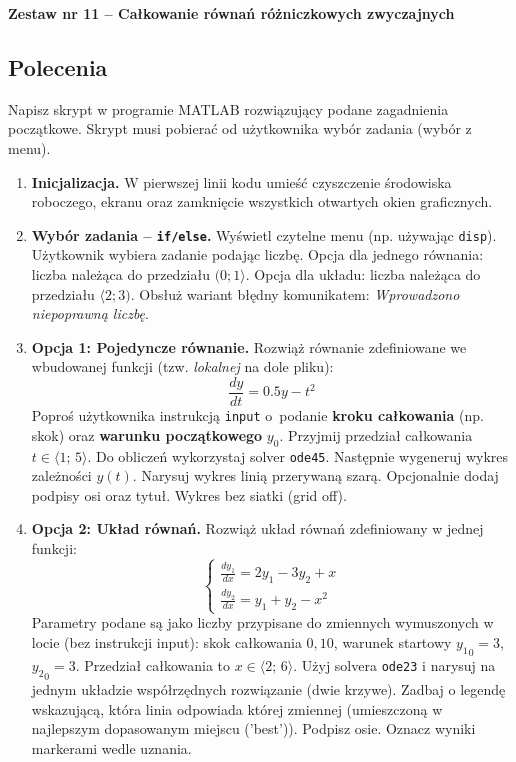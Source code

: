 \documentclass[a4paper,11pt]{article}
\begin{document}
\clearpage
\begin{center}
  {\large\bfseries Zestaw nr 11 \quad -- \quad Całkowanie równań różniczkowych zwyczajnych}
\end{center}
\hrulefill
\vspace{0.4cm}

\subsection*{Polecenia}

Napisz skrypt w programie MATLAB rozwiązujący podane zagadnienia początkowe. Skrypt musi pobierać od użytkownika wybór zadania (wybór z menu).

\begin{enumerate}[leftmargin=*, label=\textbf{\arabic*.}, itemsep=2pt]

  \item \textbf{Inicjalizacja.}
    W pierwszej linii kodu umieść czyszczenie środowiska roboczego, ekranu oraz zamknięcie wszystkich otwartych okien graficznych.

  \item \textbf{Wybór zadania -- \texttt{if/else}.}
    Wyświetl czytelne menu (np. używając \texttt{disp}). Użytkownik wybiera zadanie podając liczbę. Opcja dla jednego równania: liczba należąca do przedziału $(0; 1\rangle$. Opcja dla układu: liczba należąca do przedziału $\langle 2; 3)$. Obsłuż wariant błędny komunikatem: \textit{Wprowadzono niepoprawną liczbę}.

  \item \textbf{Opcja 1: Pojedyncze równanie.}
    Rozwiąż równanie zdefiniowane we wbudowanej funkcji (tzw. \textit{lokalnej} na dole pliku):
    \[ \frac{dy}{dt} = 0.5y - t^2 \]
    Poproś użytkownika instrukcją \texttt{input} o~podanie \textbf{kroku całkowania} (np. skok) oraz \textbf{warunku początkowego} $y_0$. Przyjmij przedział całkowania $t \in \langle 1;\,5 \rangle$.
    Do obliczeń wykorzystaj solver \texttt{ode45}. Następnie wygeneruj wykres zależności $y(t)$. Narysuj wykres linią przerywaną szarą. Opcjonalnie dodaj podpisy osi oraz tytuł. Wykres bez siatki (grid off).

  \item \textbf{Opcja 2: Układ równań.}
    Rozwiąż układ równań zdefiniowany w jednej funkcji:\\[-0.5em]
    \[
    \begin{cases}
      \frac{dy_1}{dx} = 2y_1 - 3y_2 + x \\
      \frac{dy_2}{dx} = y_1 + y_2 - x^2
    \end{cases}
    \]
    Parametry podane są jako liczby przypisane do zmiennych wymuszonych w locie (bez instrukcji input): skok całkowania $0{,}10$, warunek startowy $ {y_1}_{0} = 3 $, $ {y_2}_{0} = 3 $. Przedział całkowania to $x \in \langle 2;\,6 \rangle$.
    Użyj solvera \texttt{ode23} i narysuj na jednym układzie współrzędnych rozwiązanie (dwie krzywe). Zadbaj o legendę wskazującą, która linia odpowiada której zmiennej (umieszczoną w najlepszym dopasowanym miejscu ('best')). Podpisz osie. Oznacz wyniki markerami wedle uznania.

\end{enumerate}
\end{document}
